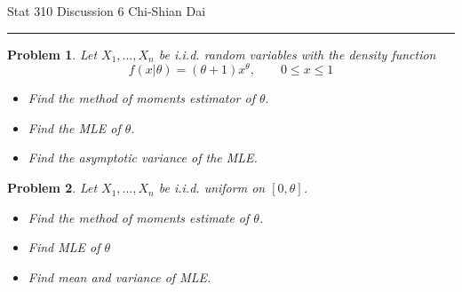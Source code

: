 \documentclass[12pt]{article}
\newtheorem{problem}{Problem}
\begin{document}
	\noindent Stat 310 \hfill  Discussion 6 \hfill Chi-Shian Dai
\smallskip
	\hrule
	\vspace*{2\baselineskip}

\begin{problem}
Let $X_1,\dots,X_n$ be i.i.d. random variables with the density function
$$f(x|\theta)=(\theta+1)x^{\theta},\qquad 0\leq x\leq 1$$
\begin{itemize}
	\item[a.] Find the method of moments estimator of $\theta.$
	\item[b.] Find the MLE of $\theta.$
	\item[c.] Find the asymptotic variance of the MLE.
\end{itemize}
	\end{problem}
\vspace*{8\baselineskip}
\begin{problem}
 Let $X_1,\dots,X_n$ be i.i.d. uniform on $[0,\theta]$.
 \begin{itemize}
 	\item[a.] Find the method of moments estimate of $\theta$.
 	\item[b.] Find MLE of $\theta$
 	\item[c.] Find mean and variance of MLE. 
 \end{itemize}

\end{problem}
\end{document}
